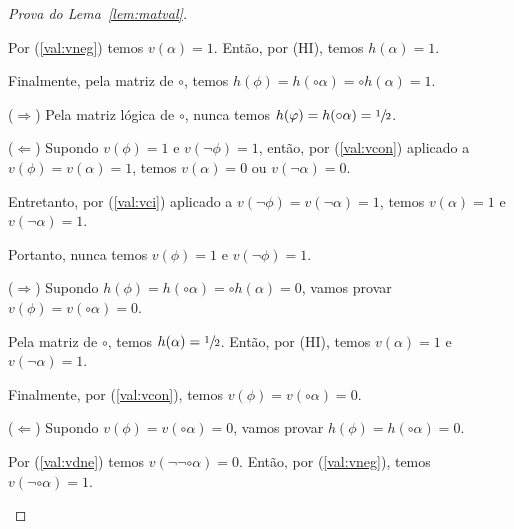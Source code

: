 \begin{proof}[Prova do Lema~\ref{lem:matval}]
\begin{provaporcasos}
\begin{provaporsubcasos}
\begin{provaporsubsubcasos}
                                    Por (\ref{val:vneg}) temos $v(\alpha) = 1$. Então, por (HI), temos $h(\alpha) = 1$. 
                                    
                                    Finalmente, pela matriz de $\circ$, temos $h(\phi) = h(\circ \alpha) = \circ h(\alpha) = 1$.
                            \end{provaporsubsubcasos}
                            
                            
                            ($\Longrightarrow$) Pela matriz lógica de $\circ$, nunca temos $h(\varphi) = h(\circ \alpha) = \sfrac{1}{2}{}$.
                            
                            ($\Longleftarrow$) Supondo $v(\phi) = 1$ e $v(\neg \phi) = 1$, então, por (\ref{val:vcon}) aplicado a $v(\phi) = v(\alpha) = 1$, temos $v(\alpha) = 0$ ou $v(\neg \alpha) = 0$. 
                            
                            Entretanto, por (\ref{val:vci}) aplicado a $v(\neg \phi) = v(\neg \alpha) = 1$, temos $v(\alpha) = 1$ e $v(\neg \alpha) = 1$.

                            Portanto, nunca temos $v(\phi) = 1$ e $v(\neg \phi) = 1$.

                            
                        

                            ($\Longrightarrow$) Supondo $h(\phi) = h(\circ \alpha) = \circ h(\alpha) = 0$, vamos provar $v(\phi) = v(\circ \alpha) = 0$.

                            Pela matriz de $\circ$, temos $h(\alpha) = \sfrac{1}{2}{}$. Então, por (HI), temos $v(\alpha) = 1$ e $v(\neg \alpha) = 1$. 
                            
                            Finalmente, por (\ref{val:vcon}), temos $v(\phi) = v(\circ \alpha) = 0$.
                        
                            ($\Longleftarrow$) Supondo $v(\phi) = v(\circ \alpha) = 0$, vamos provar $h(\phi) = h(\circ \alpha) = 0$.

                            Por (\ref{val:vdne}) temos $v(\neg \neg \circ \alpha) = 0$. Então, por (\ref{val:vneg}), temos $v(\neg \circ \alpha) = 1$.


\end{provaporsubcasos}
\end{provaporcasos}
\end{proof}
